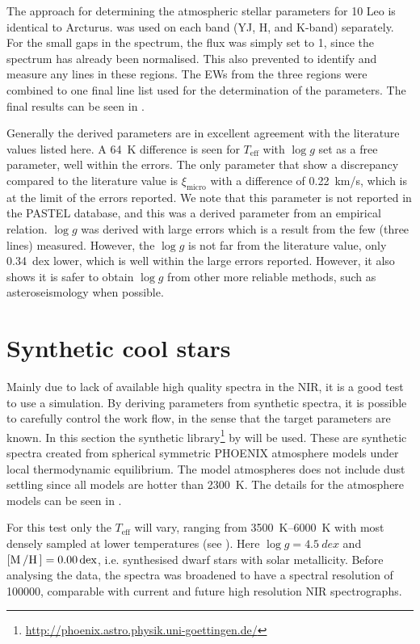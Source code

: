 The approach for determining the atmospheric stellar parameters for 10 Leo is identical to Arcturus.
 was used on each band (YJ, H, and K-band) separately. For the small gaps in the
spectrum, the flux was simply set to 1, since the spectrum has already been normalised. This also
prevented  to identify and measure any lines in these regions. The EWs from the three
regions were combined to one final line list used for the determination of the parameters. The final
results can be seen in .

Generally the derived parameters are in excellent agreement with the literature values listed here.
A \SI{64}{K} difference is seen for $T_\mathrm{eff}$ with $\log g$ set as a free parameter, well
within the errors. The only parameter that show a discrepancy compared to the literature value is
$\xi_\mathrm{micro}$ with a difference of \SI{0.22}{km/s}, which is at the limit of the errors
reported. We note that this parameter is not reported in the PASTEL database, and this was a derived
parameter from an empirical relation. $\log g$ was derived with large errors which is a result from
the few  (three lines) measured. However, the $\log g$ is not far from the literature
value, only \SI{0.34}{dex} lower, which is well within the large errors reported. However, it also
shows it is safer to obtain $\log g$ from other more reliable methods, such as asteroseismology when
possible.


\section{Synthetic cool stars}
\label{sec:synthetic_spectra}

Mainly due to lack of available high quality spectra in the NIR, it is a good test to use a
simulation. By deriving parameters from synthetic spectra, it is possible to carefully control the
work flow, in the sense that the target parameters are known. In this section the synthetic
library\footnote{\url{http://phoenix.astro.physik.uni-goettingen.de/}} by \citet{Husser2013} will be
used. These are synthetic spectra created from spherical symmetric PHOENIX atmosphere models under
local thermodynamic equilibrium. The model atmospheres does not include dust settling since all
models are hotter than \SI{2300}{K}. The details for the atmosphere models can be seen in
\citet{Husser2013}.

For this test only the $T_\mathrm{eff}$ will vary, ranging from \SIrange{3500}{6000}{K} with
most densely sampled at lower temperatures (see ). Here $\log
g=\SI{4.5}{dex}$ and $[\ion{M}/\ion{H}]=\SI{0.00}{dex}$, i.e. synthesised dwarf stars with solar
metallicity. Before analysing the data, the spectra was broadened to have a spectral resolution of
\num{100000}, comparable with current and future high resolution NIR spectrographs.

